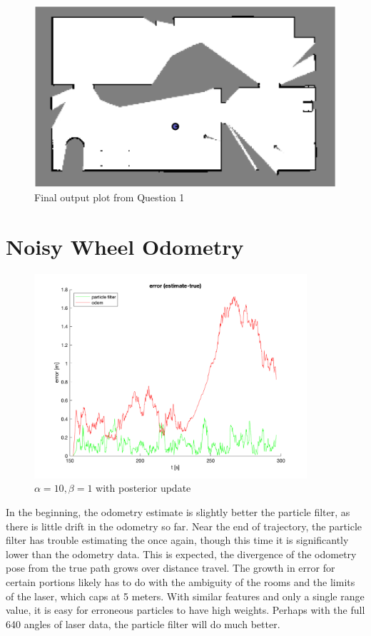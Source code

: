 \documentclass{article} %
\begin{document}
\begin{figure}[hbt]
  \centering
    \includegraphics[width=1.0\textwidth]{ass2_q1.png}
  \caption{Final output plot from Question 1}
  \label{fig:q1}
\end{figure}



\section{Noisy Wheel Odometry}
\begin{figure}[hbt]
  \centering
    \includegraphics[width=0.9\textwidth]{ass2_q2.png}
  \caption{$\alpha = 10, \beta = 1$ with posterior update}
\end{figure}

In the beginning, the odometry estimate is slightly better the particle filter, as there is little drift in the odometry so far. Near the end of trajectory, the particle filter has trouble estimating the once again, though this time it is significantly lower than the odometry data. This is expected, the divergence of the odometry pose from the true path grows over distance travel.
The growth in error for certain portions likely has to do with the ambiguity of the rooms and the limits of the laser, which caps at 5 meters. With similar features and only a single range value, it is easy for erroneous particles to have high weights. Perhaps with the full 640 angles of laser data, the particle filter will do much better.
\end{document}
